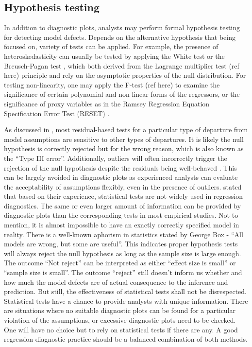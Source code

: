 \documentclass[]{interact}
\theoremstyle{plain}%
\theoremstyle{definition}
\theoremstyle{remark}
\begin{document}
\hypertarget{hypothesis-testing}{%
\subsection{Hypothesis testing}\label{hypothesis-testing}}

In addition to diagnostic plots, analysts may perform formal hypothesis
testing for detecting model defects. Depends on the alternative
hypothesis that being focused on, variety of tests can be applied. For
example, the presence of heteroskedasticity can usually be tested by
applying the White test \citep{white_heteroskedasticity-consistent_1980}
or the Breusch-Pagan test \citep{breusch_simple_1979}, which both
derived from the Lagrange multiplier test (ref here) principle and rely
on the asymptotic properties of the null distribution. For testing
non-linearity, one may apply the F-test (ref here) to examine the
significance of certain polynomial and non-linear forms of the
regressors, or the significance of proxy variables as in the Ramsey
Regression Equation Specification Error Test (RESET)
\citep{ramsey_tests_1969}.

As discussed in \citet{cook1982residuals}, most residual-based tests for
a particular type of departure from model assumptions are sensitive to
other types of departures. It is likely the null hypothesis is correctly
rejected but for the wrong reason, which is also known as the ``Type III
error''. Additionally, outliers will often incorrectly trigger the
rejection of the null hypothesis despite the residuals being
well-behaved \citep{cook_applied_1999}. This can be largely avoided in
diagnostic plots as experienced analysts can evaluate the acceptability
of assumptions flexibly, even in the presence of outliers.
\citet{montgomery_introduction_2012} stated that based on their
experience, statistical tests are not widely used in regression
diagnostics. The same or even larger amount of information can be
provided by diagnostic plots than the corresponding tests in most
empirical studies. Not to mention, it is almost impossible to have an
exactly correctly specified model in reality. There is a well-known
aphorism in statistics stated by George Box - ``All models are wrong,
but some are useful''. This indicates proper hypothesis tests will
always reject the null hypothesis as long as the sample size is large
enough. The outcome ``Not reject'' can be interpreted as either ``effect
size is small'' or ``sample size is small''. The outcome ``reject''
still doesn't inform us whether and how much the model defects are of
actual consequence to the inference and prediction. But still, the
effectiveness of statistical tests shall not be disrespected.
Statistical tests have a chance to provide analysts with unique
information. There are situations where no suitable diagnostic plots can
be found for a particular violation of the assumptions, or excessive
diagnostic plots need to be checked. One will have no choice but to rely
on statistical tests if there are any. A good regression diagnostic
practice should be a balanced combination of both methods.
\end{document}
